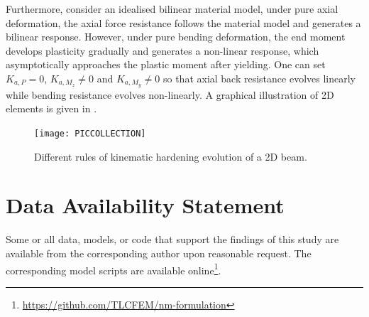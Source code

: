 Furthermore, consider an idealised bilinear material model, under pure axial deformation, the axial force resistance follows the material model and generates a bilinear response. However, under pure bending deformation, the end moment develops plasticity gradually and generates a non-linear response, which asymptotically approaches the plastic moment after yielding. One can set $K_{a,P}=0$, $K_{a,M_z}\neq0$ and $K_{a,M_y}\neq0$ so that axial back resistance evolves linearly while bending resistance evolves non-linearly. A graphical illustration of 2D elements is given in .
\begin{figure}[htb]
\centering\footnotesize
\texttt{[image: PICCOLLECTION]}
\caption{Different rules of kinematic hardening evolution of a 2D beam.}\label{fig:nm_component_kin}
\end{figure}
\section*{Data Availability Statement}
Some or all data, models, or code that support the findings of this study are available from the corresponding author upon reasonable request.
The corresponding model scripts are available online\footnote{\url{https://github.com/TLCFEM/nm-formulation}}.